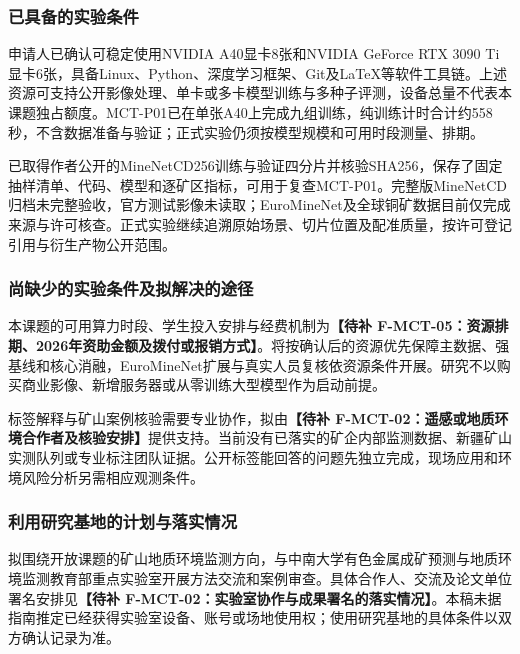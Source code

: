 \justifying
\NSFCBodyText

\subsubsection{已具备的实验条件}
申请人已确认可稳定使用NVIDIA A40显卡8张和NVIDIA GeForce RTX 3090 Ti显卡6张，具备Linux、Python、深度学习框架、Git及LaTeX等软件工具链。上述资源可支持公开影像处理、单卡或多卡模型训练与多种子评测，设备总量不代表本课题独占额度。MCT-P01已在单张A40上完成九组训练，纯训练计时合计约558秒，不含数据准备与验证；正式实验仍须按模型规模和可用时段测量、排期。

已取得作者公开的MineNetCD256训练与验证四分片并核验SHA256，保存了固定抽样清单、代码、模型和逐矿区指标，可用于复查MCT-P01。完整版MineNetCD归档未完整验收，官方测试影像未读取；EuroMineNet及全球铜矿数据目前仅完成来源与许可核查。正式实验继续追溯原始场景、切片位置及配准质量，按许可登记引用与衍生产物公开范围。

\subsubsection{尚缺少的实验条件及拟解决的途径}
本课题的可用算力时段、学生投入安排与经费机制为\textbf{【待补 F-MCT-05：资源排期、2026年资助金额及拨付或报销方式】}。将按确认后的资源优先保障主数据、强基线和核心消融，EuroMineNet扩展与真实人员复核依资源条件开展。研究不以购买商业影像、新增服务器或从零训练大型模型作为启动前提。

标签解释与矿山案例核验需要专业协作，拟由\textbf{【待补 F-MCT-02：遥感或地质环境合作者及核验安排】}提供支持。当前没有已落实的矿企内部监测数据、新疆矿山实测队列或专业标注团队证据。公开标签能回答的问题先独立完成，现场应用和环境风险分析另需相应观测条件。

\subsubsection{利用研究基地的计划与落实情况}
拟围绕开放课题的矿山地质环境监测方向，与中南大学有色金属成矿预测与地质环境监测教育部重点实验室开展方法交流和案例审查。具体合作人、交流及论文单位署名安排见\textbf{【待补 F-MCT-02：实验室协作与成果署名的落实情况】}。本稿未据指南推定已经获得实验室设备、账号或场地使用权；使用研究基地的具体条件以双方确认记录为准。
